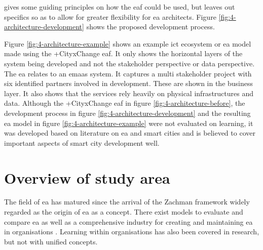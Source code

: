 
\cite{cityxchange} gives some guiding principles on how the \gls{eaf} could be used, but leaves out specifics so as to allow for greater flexibility for \gls{ea} architects. Figure \ref{fig:4-architecture-development} shows the proposed development process.


Figure \ref{fig:4-architecture-example} shows an example \gls{ict ecosystem} or \gls{ea} model made using the +CityxChange \gls{eaf}.
It only shows the horizontal layers of the system being developed and not the stakeholder perspective or data perspective. The \gls{ea} relates to an \gls{emaas} system. It captures a multi stakeholder project with six identified partners involved in development. These are shown in the business layer. It also shows that the services rely heavily on physical infrastructures and data. 
Although the +CityxChange \gls{eaf} in figure \ref{fig:4-architecture-before}, the development process in figure \ref{fig:4-architecture-development} and the resulting \gls{ea} model in figure \ref{fig:4-architecture-example} were not evaluated on learning, it was developed based on literature on \gls{ea} and smart cities and is believed to cover important aspects of smart city development well. 

\section{Overview of study area}
The field of \gls{ea} has matured since the arrival of the Zachman framework \cite{zachman1987framework} widely regarded as the origin of \gls{ea} as a concept. There exist models to evaluate and compare \gls{ea} \cite{10.1007/978-3-642-24511-4_13} as well as a comprehensive industry for creating and maintaining \gls{ea} in organisations \cite{cameron2013analyzing}. 
Learning within organisations has also been covered in research, but not with unified concepts. 

